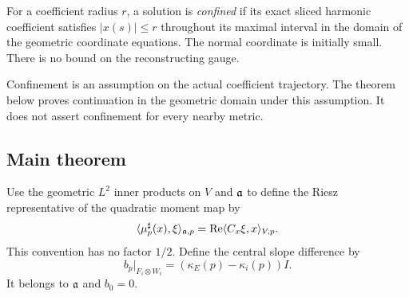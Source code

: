 \begin{definition}\label{def:confined}
For a coefficient radius $r$, a solution is \emph{confined} if its
exact sliced harmonic coefficient satisfies $|x(s)|\le r$
throughout its maximal interval in the domain of the geometric
coordinate equations. The normal coordinate is initially small.
There is no bound on the reconstructing gauge.
\end{definition}

Confinement is an assumption on the actual coefficient trajectory.
The theorem below proves continuation in the geometric domain under
this assumption. It does not assert confinement for every nearby metric.

\subsection{Main theorem}
Use the geometric $L^2$ inner products on $V$ and $\mathfrak a$ to define
the Riesz representative of the quadratic moment map by
\begin{equation}\label{eq:moment}
 \langle\mu_p^\sharp(x),\xi\rangle_{\mathfrak a,p}
       =\operatorname{Re}\langle C_x\xi,x\rangle_{V,p}.
\end{equation}
This convention has no factor $1/2$. Define the central slope difference
by
\begin{equation}\label{eq:central}
 b_p|_{F_i\otimes W_i}=(\kappa_E(p)-\kappa_i(p))I.
\end{equation}
It belongs to $\mathfrak a$ and $b_0=0$.

